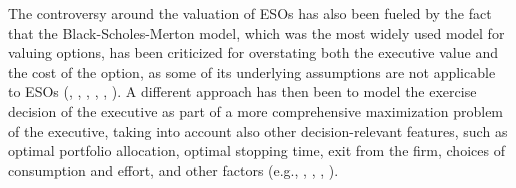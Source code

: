     The controversy around the valuation of ESOs has also been fueled by the fact that the Black-Scholes-Merton model, which was the most widely used model for valuing options, has been criticized for overstating both the executive value and the cost of the option, as some of its underlying assumptions are not applicable to ESOs (\citet{carpenter1998exercise}, \citet{meulbroek2001efficiency}, \citet{hall2003trouble}, \citet{ingersoll2006subjective}, \citet{carpenter2010optimal}, \citet{frydman2010ceo}). A different approach has then been to model the exercise decision of the executive as part of a more comprehensive maximization problem of the executive, taking into account also other decision-relevant features, such as optimal portfolio allocation, optimal stopping time, exit from the firm, choices of consumption and effort, and other factors (e.g., \citet{huddart1996employee}, \citet{ingersoll2006subjective}, \citet{grasselli2009risk}, \citet{carpenter2010optimal}).

